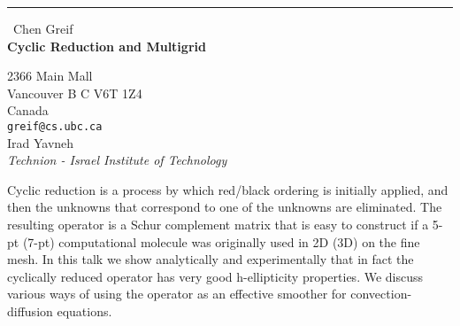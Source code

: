 \documentclass{report}
\begin{document}
\begin{center}
\rule{6in}{1pt} \
{\large Chen Greif \\
{\bf Cyclic Reduction and Multigrid}}

2366 Main Mall \\ Vancouver B C V6T 1Z4 \\ Canada
\\
{\tt greif@cs.ubc.ca}\\
Irad Yavneh\\
{\em Technion - Israel Institute of Technology}\end{center}

Cyclic reduction is a process by which red/black ordering is initially
applied, and then the unknowns that correspond to one of the unknowns are
eliminated. The resulting operator is a Schur complement matrix that is
easy to construct if a 5-pt (7-pt) computational molecule was originally
used in 2D (3D) on the fine mesh. In this talk we show analytically and
experimentally that in fact the cyclically reduced operator has very good
h-ellipticity properties. We discuss various ways of using the operator
as an effective smoother for convection-diffusion equations.
\end{document}

